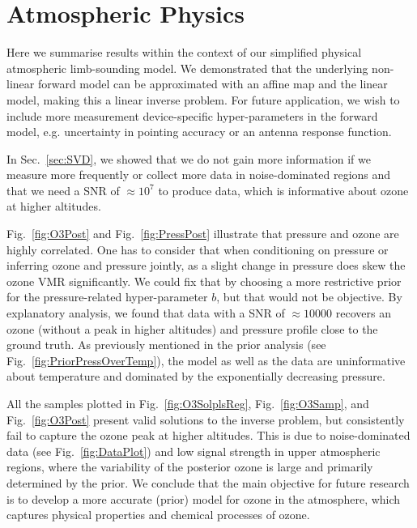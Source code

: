 \section{Atmospheric Physics}
Here we summarise results within the context of our simplified physical atmospheric limb-sounding model.
We demonstrated that the underlying non-linear forward model can be approximated with an affine map and the linear model, making this a linear inverse problem.
For future application, we wish to include more measurement device-specific hyper-parameters in the forward model, e.g. uncertainty in pointing accuracy or an antenna response function.

In Sec.~\ref{sec:SVD}, we showed that we do not gain more information if we measure more frequently or collect more data in noise-dominated regions and that we need a SNR of $\approx10^7$ to produce data, which is informative about ozone at higher altitudes.

Fig.~\ref{fig:O3Post} and Fig.~\ref{fig:PressPost} illustrate that pressure and ozone are highly correlated.
One has to consider that when conditioning on pressure or inferring ozone and pressure jointly, as a slight change in pressure does skew the ozone VMR significantly.
We could fix that by choosing a more restrictive prior for the pressure-related hyper-parameter $b$, but that would not be objective.
By explanatory analysis, we found that data with a SNR of $\approx 10000$ recovers an ozone (without a peak in higher altitudes) and pressure profile close to the ground truth.
As previously mentioned in the prior analysis (see Fig.~\ref{fig:PriorPressOverTemp}), the model as well as the data are uninformative about temperature and dominated by the exponentially decreasing pressure.

All the samples plotted in Fig.~\ref{fig:O3SolplsReg}, Fig.~\ref{fig:O3Samp}, and Fig.~\ref{fig:O3Post} present valid solutions to the inverse problem, but consistently fail to capture the ozone peak at higher altitudes.
This is due to noise-dominated data (see Fig.~\ref{fig:DataPlot}) and low signal strength in upper atmospheric regions, where the variability of the posterior ozone is large and primarily determined by the prior.
We conclude that the main objective for future research is to develop a more accurate (prior) model for ozone in the atmosphere, which captures physical properties and chemical processes of ozone.




